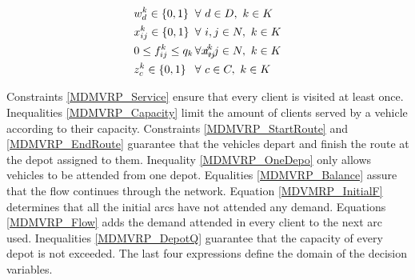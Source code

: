 \documentclass[preprint,review,12pt]{elsarticle}
\begin{document}
\begin{align}
	& w_d^k \in\{0,1\}  && \text{\hspace{-1cm}} \forall \ d \in D, \ k \in K \label{MDVMRP_DomainW} \\
	& x_{ij}^k\in\{0,1\} && \text{\hspace{-1cm}} \forall \ i,j \in N,  \ k \in K \label{MDVMRP_DomainX} \\
	& 0 \leq f_{ij}^k \leq q_k \cdot x_{ij}^k && \text{\hspace{-1cm}} \forall \ i,j \in N,  \ k \in K \label{MDVMRP_DomainF} \\
	& z_{c}^k\in\{0,1\} && \text{\hspace{-1cm}} \forall \ c \in C,  \ k \in K \label{MDVMRP_DomainZ} 
\end{align}

Constraints \eqref{MDMVRP_Service} ensure that every client is visited at least once. Inequalities \eqref{MDMVRP_Capacity} limit the amount of clients served by a vehicle according to their capacity. Constraints \eqref{MDMVRP_StartRoute} and \eqref{MDMVRP_EndRoute} guarantee that the vehicles depart and finish the route at the depot assigned to them. Inequality \eqref{MDMVRP_OneDepo} only allows vehicles to be attended from one depot. Equalities \eqref{MDMVRP_Balance} assure that the flow continues through the network. Equation \eqref{MDVMRP_InitialF} determines that all the initial arcs have not attended any demand. Equations \eqref{MDMVRP_Flow} adds the demand attended in every client to the next arc used. Inequalities \eqref{MDMVRP_DepotQ} guarantee that the capacity of every depot is not exceeded. The last four expressions define the domain of the decision variables.
\end{document}
